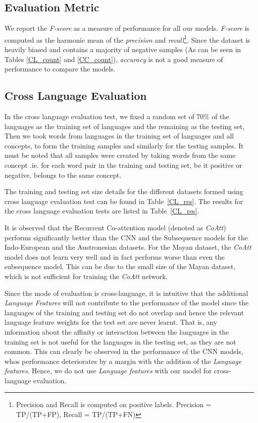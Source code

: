 \documentclass[11pt,letterpaper]{article}
\begin{document}
\subsection{Evaluation Metric}

We report the \textit{F-score} as a measure of performance for all our models. \textit{F-score} is computed as the harmonic mean of the \textit{precision} and \textit{recall}\footnote{Precision and Recall is computed on positive labels. Precision = TP/(TP+FP), Recall = TP/(TP+FN)}. Since the dataset is heavily biased and contains a majority of negative samples (As can be seen in Tables \ref{CL_count} and \ref{CC_count}), \textit{accuracy} is not a good measure of performance to compare the models.

\subsection{Cross Language Evaluation}

In the cross language evaluation test, we fixed a random set of 70\% of the languages as the training set of languages and the remaining as the testing set, Then we took words from languages in the training set of languages and all concepts, to form the training samples and similarly for the testing samples. It must be noted that all samples were created by taking words from the same concept .ie. for each word pair in the training and testing set, be it positive or negative, belongs to the same concept.

The training and testing set size details for the different datasets formed using cross language evaluation test can be found in Table~\ref{CL_res}. The results for the cross language evaluation tests are listed in Table~\ref{CL_res}.

It is observed that the Recurrent Co-attention model (denoted as \textit{CoAtt}) performs significantly better than the CNN and the Subsequence models for the Indo-European and the Austronesian datasets. For the Mayan dataset, the \textit{CoAtt} model does not learn very well and in fact performs worse than even the subsequence model. This can be due to the small size of the Mayan dataset, which is not sufficient for training the \textit{CoAtt} network. 

Since the mode of evaluation is cross-language, it is intuitive that the additional \textit{Language Features} will not contribute to the performance of the model since the languages of the training and testing set do not overlap and hence the relevant language feature weights for the test set are never learnt. That is, any information about the affinity or interaction between the languages in the training set is not useful for the languages in the testing set, as they are not common. This can clearly be observed in the performance of the CNN models, whos performance deteriorates by a margin with the addition of the \textit{Language features}. Hence, we do not use \textit{Language features} with our model for cross-language evaluation.
\end{document}
